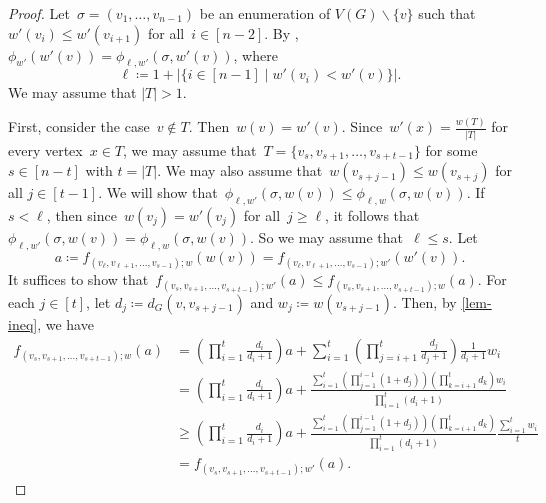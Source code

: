 \documentclass[10pt,a4paper]{amsart}
\let\setminus=\smallsetminus
\newcommand*{\abs}[1]{\ensuremath{{\left\lvert {#1} \right\rvert}}}
\begin{document}
\begin{proof}
    Let~${\sigma=(v_1, \ldots, v_{n-1})}$ be an enumeration of $V(G)\setminus \{v\}$ such that~${w'(v_i) \leq w'(v_{i+1})}$ for all~${i \in [n-2]}$. 
    By , ${\phi_{w'}(w'(v)) = \phi_{\ell, w'}(\sigma, w'(v))}$, where
    \[ \ell\coloneq 1+\abs{\{ i\in[n-1]\mid w'(v_i)<w'(v)\}}.\]
    We may assume that $\abs{T}>1$.
     

    First, consider the case~${v \notin T}$. 
    Then~${w(v) = w'(v)}$. 
    Since~${w'(x) = \frac{w(T)}{\abs{T}}}$ for every vertex~$x\in T$, we may assume that~${T=\{v_s,v_{s+1},\ldots,v_{s+t-1}\}}$ for some~${s \in [n-t]}$ with $t=\abs{T}$.
    We may also assume that~${w(v_{s+j-1}) \leq w(v_{s+j})}$ for all $j\in [t-1]$.
    We will show that~${\phi_{\ell, w'}(\sigma, w(v)) \leq \phi_{\ell, w}(\sigma, w(v))}$. 
    If~${s < \ell}$, then since~${w(v_j) = w'(v_j)}$ for all~${j \geq \ell}$, it follows that ${\phi_{\ell, w'}(\sigma, w(v)) = \phi_{\ell, w}(\sigma, w(v))}$. 
    So we may assume that~${\ell \leq s}$. 
    Let 
    \[
        a \coloneqq f_{(v_{\ell}, v_{\ell+1}, \ldots, v_{s-1}); w}(w(v)) = f_{(v_{\ell}, v_{\ell+1}, \ldots, v_{s-1}); w'}(w'(v)). 
    \]
    It suffices to show that~${f_{(v_s, v_{s+1},\ldots,v_{s+t-1}); w'}(a) \leq f_{(v_s, v_{s+1},\ldots,v_{s+t-1}); w}(a)}$. 
    For each $j\in [t]$, let $d_j\coloneqq d_G(v,v_{s+j-1})$
    and $w_j\coloneqq w(v_{s+j-1})$.
    Then, by \cref{lem-ineq}, we have 
    \begin{align*}
        f_{(v_s, v_{s+1},\ldots,v_{s+t-1});w}(a) 
        &= \left(\prod\limits_{i=1}^t\frac{d_i}{d_i+1} \right)a 
        + \sum_{i=1}^t \left(\prod\limits_{j=i+1}^t \frac{d_j}{d_j+1} \right)\frac{1}{d_i+1} w_i\\
        &=\left(\prod\limits_{i=1}^t\frac{d_i}{d_i+1} \right)a 
        + \frac{
        \sum\limits_{i=1}^t \left(\prod\limits_{j=1}^{i-1}(1+d_j)\right)\left(\prod\limits_{k=i+1}^t d_k \right) w_i }
        {\prod\limits_{i=1}^t (d_i+1)}\\
        &\ge \left(\prod\limits_{i=1}^t\frac{d_i}{d_i+1} \right)a 
        +  \frac{
        \sum\limits_{i=1}^t \left(\prod\limits_{j=1}^{i-1}(1+d_j)\right)\left(\prod\limits_{k=i+1}^t d_k \right) }
        {\prod\limits_{i=1}^t (d_i+1)}\frac{\sum\limits_{i=1}^t w_i}{t} \\
        &= f_{(v_s, v_{s+1},\ldots,v_{s+t-1});w'}(a).
    \end{align*}


\end{proof}
\end{document}
